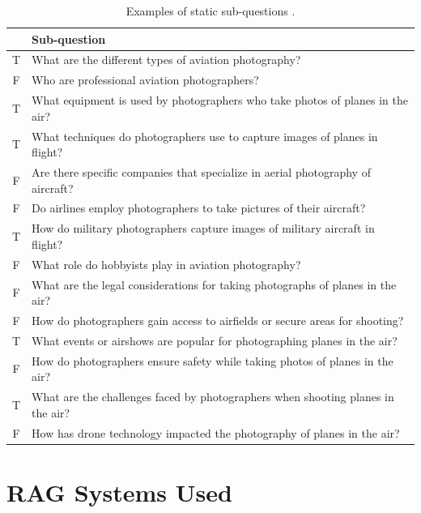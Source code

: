 \documentclass[11pt]{article}
\begin{document}
\begin{table}[H]
\centering\small
\begin{tabularx}{\columnwidth}{@{}c L@{}}
\toprule
& \textbf{Sub-question} \\
\midrule
T & What are the different types of aviation photography? \\
F & Who are professional aviation photographers? \\
T & What equipment is used by photographers who take photos of planes in the air? \\
T & What techniques do photographers use to capture images of planes in flight? \\
F & Are there specific companies that specialize in aerial photography of aircraft? \\
F & Do airlines employ photographers to take pictures of their aircraft? \\
T & How do military photographers capture images of military aircraft in flight? \\
F & What role do hobbyists play in aviation photography? \\
F & What are the legal considerations for taking photographs of planes in the air? \\
F & How do photographers gain access to airfields or secure areas for shooting? \\
T & What events or airshows are popular for photographing planes in the air? \\
F & How do photographers ensure safety while taking photos of planes in the air? \\
T & What are the challenges faced by photographers when shooting planes in the air? \\
F & How has drone technology impacted the photography of planes in the air? \\
\bottomrule
\end{tabularx}
\caption{Examples of static sub-questions \citep{xie2024subquestion}.}
\end{table}

\section{RAG Systems Used}
\label{app:rag}
\end{document}
